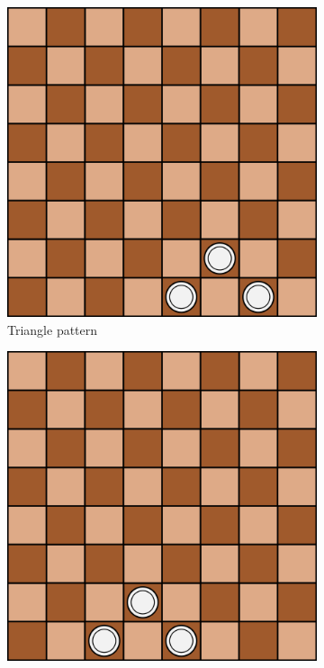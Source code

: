 \begin{figure}
    \centering
    \begin{subfigure}[b]{0.475\textwidth}
        \centering
        \includegraphics[scale=.6]{graphics/warcaby_patternTriangle.png}
        \caption[Network2]%
        {{Triangle pattern}}    
        \label{fig:pattern_triangle}
    \end{subfigure}
    \hfill
    \begin{subfigure}[b]{0.475\textwidth}  
        \centering 
        \includegraphics[scale=.6]{graphics/warcaby_patternOreo.png}

\end{subfigure}
\end{figure}
